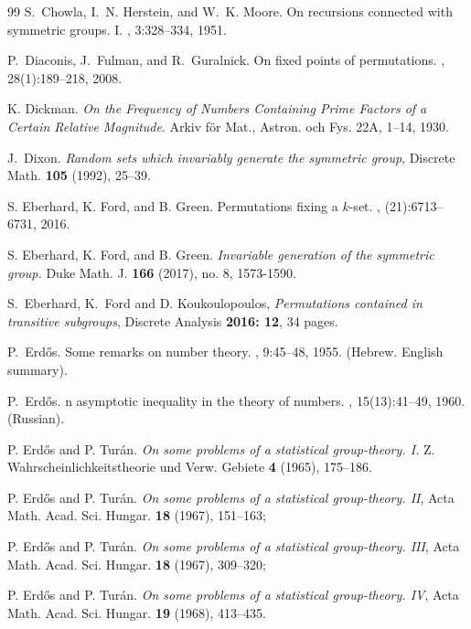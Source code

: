 \begin{thebibliography}{99}
{\sc S.~Chowla, I.~N. Herstein, and W.~K. Moore}.
\newblock On recursions connected with symmetric groups. {I}.
, 3:328--334, 1951.
%
%
%
%
%
%
%
%

{\sc P.~Diaconis, J.~Fulman, and R.~Guralnick}.
\newblock On fixed points of permutations.
, 28(1):189--218, 2008.

{\sc K. Dickman}.  \emph{On the Frequency of Numbers Containing Prime Factors of a Certain Relative Magnitude}. Arkiv f\"or Mat., Astron. och Fys. 22A, 1--14, 1930.


 {\sc J.~Dixon}. \emph{Random sets which invariably generate the symmetric group}, Discrete Math. \textbf
{105} (1992), 25--39.


{\sc S. Eberhard, K. Ford, and B. Green}.
\newblock Permutations fixing a {$k$}-set.
, (21):6713--6731, 2016.

{\sc S. Eberhard, K. Ford, and B. Green}.
\newblock \emph{Invariable generation of the symmetric group.}
\newblock Duke Math. J. {\bf 166} (2017), no. 8, 1573-1590.

{\sc S.~Eberhard, K.~Ford and D. Koukoulopoulos},
\emph{Permutations contained in transitive subgroups},
Discrete Analysis {\bf 2016: 12}, 34 pages. 

{\sc P.~Erd{\H{o}}s}.
\newblock Some remarks on number theory.
, 9:45--48, 1955.
\newblock (Hebrew. English summary).

{\sc P.~Erd{\H{o}}s}.
n asymptotic inequality in the theory of numbers.
, 15(13):41--49, 1960.
\newblock (Russian).

{\sc P. Erd{\H o}s and P. Tur{\' a}n}.
\emph{On some problems of a statistical group-theory. I.} Z. Wahrscheinlichkeitstheorie und Verw. Gebiete  {\bf 4}  (1965), 175--186.
%
%
 
 
{\sc P. Erd{\H o}s and P. Tur{\' a}n}.
 \emph{On some problems of a statistical group-theory. II},
 Acta Math. Acad. Sci. Hungar.  {\bf 18}  (1967), 151--163;
 
 {\sc P. Erd{\H o}s and P. Tur{\' a}n}.
 \emph{On some problems of a statistical group-theory. III},
 Acta Math. Acad. Sci. Hungar.  {\bf 18}  (1967), 309--320;
 
 {\sc P. Erd{\H o}s and P. Tur{\' a}n}.
 \emph{On some problems of a statistical group-theory. IV},
 Acta Math. Acad. Sci. Hungar.  {\bf 19}  (1968), 413--435.
		

\end{thebibliography}
